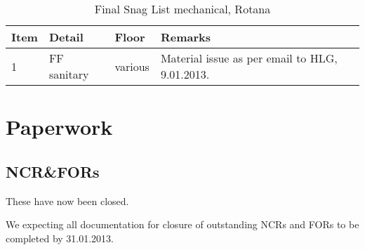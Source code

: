 \begin{table}[htbp]
\begin{tabular}{lllp{4.5cm}}
\toprule
Item &Detail &Floor  & Remarks\\
\midrule
1 &FF sanitary &various & Material issue as per email to HLG, 9.01.2013. \\
\bottomrule
\end{tabular}
\caption{Final Snag List mechanical, Rotana}

\end{table}


\section{Paperwork}

\subsection{NCR\&FORs}

These have now been closed. 

\begin{comment}
\begin{table}[htbp]
\small
\begin{tabular}{lp{3.5cm}llp{2.5cm}}
\toprule
Item &NCR & Levels & Status &Remarks\\ 
\midrule
1    &Fire alarm cables and belden cables pulled in same cable tray and CCTV without containment inside ELV room. 
& all & &superceded by events, due to new EI.\\
\bottomrule
\end{tabular}
\caption{List of outstanding electrical NCRs, Rotana Tower}
\end{table}
\end{comment}

We expecting all documentation for closure of outstanding NCRs and FORs to be completed by 31.01.2013.

















